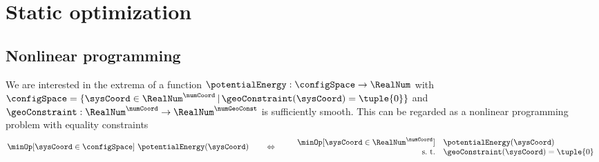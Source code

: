 \section{Static optimization}
\subsection{Nonlinear programming}
We are interested in the extrema of a function $\potentialEnergy : \configSpace \rightarrow \RealNum$ with $\configSpace = \{\sysCoord\in\RealNum^{\numCoord} \,|\, \geoConstraint(\sysCoord) = \tuple{0} \}$ and $\geoConstraint: \RealNum^{\numCoord} \rightarrow \RealNum^{\numGeoConst}$ is sufficiently smooth.
This can be regarded as a nonlinear programming problem with equality constraints
\begin{align}\label{eq:DefNonlinearProgram}
 \minOp[\sysCoord\in\configSpace] \ \potentialEnergy(\sysCoord)
\qquad\Leftrightarrow\qquad
 \begin{array}{rl}
  \minOp[\sysCoord\in\RealNum^\numCoord] & \potentialEnergy(\sysCoord) \\
  \text{s.\ t.} & \geoConstraint(\sysCoord) = \tuple{0}
 \end{array}
\end{align}

